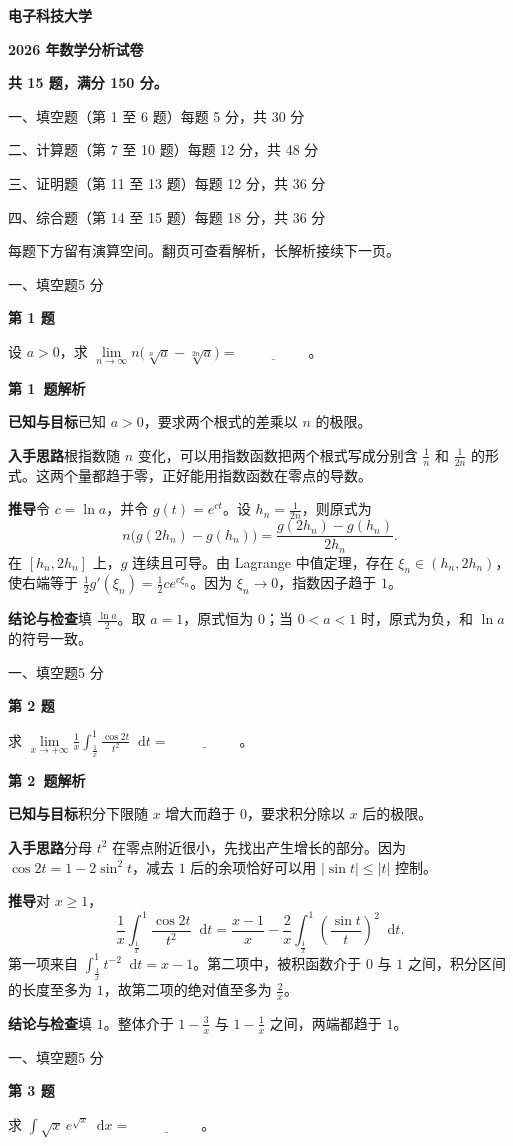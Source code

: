 \documentclass[UTF8,zihao=-4,fontset=fandol]{ctexart}
\newcommand{\dd}{\mathop{}\!\mathrm{d}}
\newcommand{\blank}{\underline{\hspace{5em}}}
\newcommand{\Question}[3]{%
  \clearpage
  \def\CurrentNumber{#1}%
  \pdfbookmark[1]{第 #1 题}{q#1}%
  {\small #2\hfill #3 分}\par\medskip
  {\Large\bfseries 第 #1 题}\par\medskip
  \fontsize{14}{22}\selectfont
}
\newcommand{\Solution}{%
  \clearpage
  \fontsize{12}{18}\selectfont
  {\large\bfseries 第 \CurrentNumber\ 题解析}\par\smallskip
}
\newcommand{\Known}{\par\textbf{已知与目标}\quad}
\newcommand{\Method}{\par\textbf{入手思路}\quad}
\newcommand{\Derive}{\par\textbf{推导}\quad}
\newcommand{\Verify}{\par\textbf{结论与检查}\quad}
\begin{document}
{\Huge\bfseries 电子科技大学\par}
\medskip
{\LARGE\bfseries 2026 年数学分析试卷\par}
\bigskip
\textbf{共 15 题，满分 150 分。}

一、填空题（第 1 至 6 题）\hfill 每题 5 分，共 30 分\par
二、计算题（第 7 至 10 题）\hfill 每题 12 分，共 48 分\par
三、证明题（第 11 至 13 题）\hfill 每题 12 分，共 36 分\par
四、综合题（第 14 至 15 题）\hfill 每题 18 分，共 36 分\par

\bigskip
每题下方留有演算空间。翻页可查看解析，长解析接续下一页。

\Question{1}{一、填空题}{5}
设 $a>0$，求 $\lim\limits_{n\to\infty}n\bigl(\sqrt[n]{a}-\sqrt[2n]{a}\bigr)=\blank$。

\Solution
\Known 已知 $a>0$，要求两个根式的差乘以 $n$ 的极限。
\Method 根指数随 $n$ 变化，可以用指数函数把两个根式写成分别含 $\frac{1}{n}$ 和 $\frac{1}{2n}$ 的形式。这两个量都趋于零，正好能用指数函数在零点的导数。
\Derive 令 $c=\ln a$，并令 $g(t)=e^{ct}$。设 $h_n=\frac{1}{2n}$，则原式为
\[
n\bigl(g(2h_n)-g(h_n)\bigr)
=\frac{g(2h_n)-g(h_n)}{2h_n}.
\]
在 $[h_n,2h_n]$ 上，$g$ 连续且可导。由 Lagrange 中值定理，存在 $\xi_n\in(h_n,2h_n)$，使右端等于 $\frac{1}{2}g'(\xi_n)=\frac{1}{2}c e^{c\xi_n}$。因为 $\xi_n\to 0$，指数因子趋于 $1$。
\Verify 填 $\boxed{\frac{\ln a}{2}}$。取 $a=1$，原式恒为 $0$；当 $0<a<1$ 时，原式为负，和 $\ln a$ 的符号一致。

\Question{2}{一、填空题}{5}
求 $\lim\limits_{x\to+\infty}\frac{1}{x}\int_{\frac{1}{x}}^1\frac{\cos 2t}{t^2}\dd t=\blank$。

\Solution
\Known 积分下限随 $x$ 增大而趋于 $0$，要求积分除以 $x$ 后的极限。
\Method 分母 $t^2$ 在零点附近很小，先找出产生增长的部分。因为 $\cos 2t=1-2\sin^2 t$，减去 $1$ 后的余项恰好可以用 $|\sin t|\le |t|$ 控制。
\Derive 对 $x\ge 1$，
\[
\frac{1}{x}\int_{\frac{1}{x}}^1\frac{\cos 2t}{t^2}\dd t
=\frac{x-1}{x}-\frac{2}{x}\int_{\frac{1}{x}}^1\left(\frac{\sin t}{t}\right)^2\dd t.
\]
第一项来自 $\int_{\frac{1}{x}}^1 t^{-2}\dd t=x-1$。第二项中，被积函数介于 $0$ 与 $1$ 之间，积分区间的长度至多为 $1$，故第二项的绝对值至多为 $\frac{2}{x}$。
\Verify 填 $\boxed{1}$。整体介于 $1-\frac{3}{x}$ 与 $1-\frac{1}{x}$ 之间，两端都趋于 $1$。

\Question{3}{一、填空题}{5}
求 $\displaystyle\int\sqrt{x}\,e^{\sqrt{x}}\dd x=\blank$。
\end{document}
